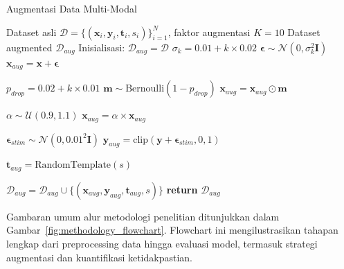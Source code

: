 \begin{algorithm}[htbp]
\caption{Augmentasi Data Multi-Modal}
\label{alg:augmentation}
\begin{algorithmic}[1]
\Require Dataset asli $\mathcal{D} = \{(\mathbf{x}_i, \mathbf{y}_i, \mathbf{t}_i, s_i)\}_{i=1}^N$, faktor augmentasi $K = 10$
\Ensure Dataset augmented $\mathcal{D}_{aug}$
\State Inisialisasi: $\mathcal{D}_{aug} = \mathcal{D}$
        \State {}
        \State $\sigma_k = 0.01 + k \times 0.02$ 
        \State $\boldsymbol{\epsilon} \sim \mathcal{N}(0, \sigma_k^2 \mathbf{I})$
        \State $\mathbf{x}_{aug} = \mathbf{x} + \boldsymbol{\epsilon}$

        \State {}
            \State $p_{drop} = 0.02 + k \times 0.01$ 
            \State $\mathbf{m} \sim \text{Bernoulli}(1 - p_{drop})$
            \State $\mathbf{x}_{aug} = \mathbf{x}_{aug} \odot \mathbf{m}$
        \EndIf

        \State {}
            \State $\alpha \sim \mathcal{U}(0.9, 1.1)$
            \State $\mathbf{x}_{aug} = \alpha \times \mathbf{x}_{aug}$
        \EndIf

        \State {}
        \State $\boldsymbol{\epsilon}_{stim} \sim \mathcal{N}(0, 0.01^2 \mathbf{I})$
        \State $\mathbf{y}_{aug} = \text{clip}(\mathbf{y} + \boldsymbol{\epsilon}_{stim}, 0, 1)$

        \State {}
        \State $\mathbf{t}_{aug} = \text{RandomTemplate}(s)$ 

        \State $\mathcal{D}_{aug} = \mathcal{D}_{aug} \cup \{(\mathbf{x}_{aug}, \mathbf{y}_{aug}, \mathbf{t}_{aug}, s)\}$
    \EndFor
\EndFor
\State \textbf{return} $\mathcal{D}_{aug}$
\end{algorithmic}
\end{algorithm}

Gambaran umum alur metodologi penelitian ditunjukkan dalam Gambar~\ref{fig:methodology_flowchart}. Flowchart ini mengilustrasikan tahapan lengkap dari preprocessing data hingga evaluasi model, termasuk strategi augmentasi dan kuantifikasi ketidakpastian.

